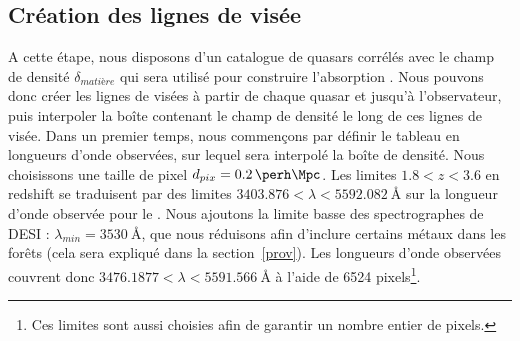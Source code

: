 \documentclass[11pt, twoside, a4paper, openright]{report}
\begin{document}
\subsection{Création des lignes de visée}
\label{subsec:los_interp}
A cette étape, nous disposons d'un catalogue de quasars corrélés avec le champ de densité $\delta_{matière}$ qui sera utilisé pour construire l'absorption \lya{}. Nous pouvons donc créer les lignes de visées à partir de chaque quasar et jusqu'à l'observateur, puis interpoler la boîte contenant le champ de densité le long de ces lignes de visée.
Dans un premier temps, nous commençons par définir le tableau en longueurs d'onde observées, sur lequel sera interpolé la boîte de densité. Nous choisissons une taille de pixel $d_{pix} = \SI{0.2}{\perh\Mpc}$. Les limites $\num{1.8} < z < \num{3.6}$ en redshift se traduisent par des limites $\num{3403.876} < \lambda < \SI{5592.082}{\angstrom}$ sur la longueur d'onde observée pour le \lya{}. Nous ajoutons la limite basse des spectrographes de DESI : $\lambda_{min} = \SI{3530}{\angstrom}$, que nous réduisons afin d'inclure certains métaux dans les forêts (cela sera expliqué dans la section~\ref{prov}). Les longueurs d'onde observées couvrent donc $\num{3476.1877} < \lambda < \SI{5591.566}{\angstrom}$ à l'aide de \num{6524} pixels\footnote{Ces limites sont aussi choisies afin de garantir un nombre entier de pixels.}.
\end{document}
